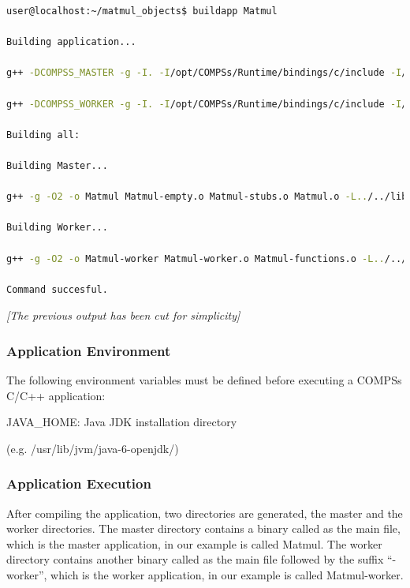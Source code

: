 \begin{lstlisting}[language=bash]
user@localhost:~/matmul_objects$ buildapp Matmul

Building application...

g++ -DCOMPSS_MASTER -g -I. -I/opt/COMPSs/Runtime/bindings/c/include -I/opt/COMPSs/Runtime/bindings/bindings-common/include -c Block.cc Matrix.cc ar rvs libmaster.a Block.o Matrix.o

g++ -DCOMPSS_WORKER -g -I. -I/opt/COMPSs/Runtime/bindings/c/include -I/opt/COMPSs/Runtime/bindings/bindings-common/include -c Block.cc Matrix.cc ar rvs libworker.a Block.o Matrix.o

Building all:

Building Master...

g++ -g -O2 -o Matmul Matmul-empty.o Matmul-stubs.o Matmul.o -L../../lib -lmaster -L/usr/lib/jvm/java-6-openjdk-amd64/jre/lib/amd64/server -ljvm -ldl -L/opt/COMPSs/Runtime/bindings/c/../bindings-common/lib -lbindings_common -L/opt/COMPSs/Runtime/bindings/c/lib -lcbindings -lboost_iostreams -lboost_serialization

Building Worker...

g++ -g -O2 -o Matmul-worker Matmul-worker.o Matmul-functions.o -L../../lib -lworker -ldl -lboost_iostreams -lboost_serialization -L/opt/COMPSs/Runtime/bindings/c/lib

Command succesful.
\end{lstlisting}

\emph{[The previous output has been cut for simplicity]}

\subsubsection{Application Environment}
The following environment variables must be defined before executing a COMPSs C/C++ application:
            
\begin{center}
JAVA\_HOME: Java JDK installation directory 

(e.g. /usr/lib/jvm/java-6-openjdk/)
\end{center}


\subsubsection{Application Execution}
After compiling the application, two directories are generated, the master and the worker directories. 
The master directory contains a binary called as the main file, which is the master application, in our 
example is called Matmul. The worker directory contains another binary called as the main file followed 
by the suffix ``-worker'', which is the worker application, in our example is called Matmul-worker.

